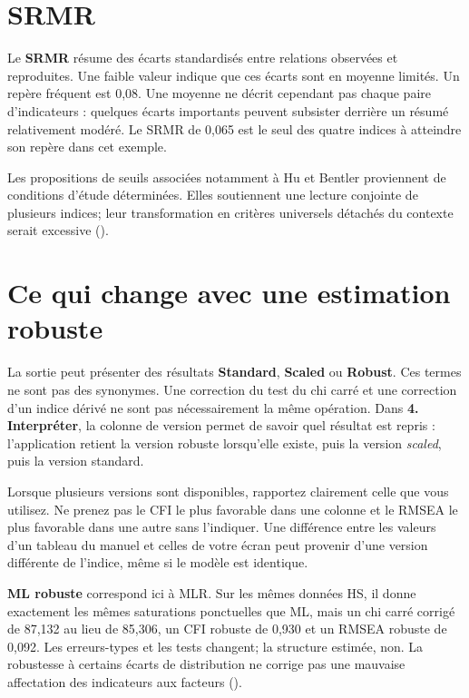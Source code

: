 \documentclass[
  french,
  11pt,
  a4paper,
  DIV=11,
  numbers=noendperiod]{scrreprt}
\begin{document}
\section{SRMR}\label{srmr}

Le \textbf{SRMR} résume des écarts standardisés entre relations
observées et reproduites. Une faible valeur indique que ces écarts sont
en moyenne limités. Un repère fréquent est 0,08. Une moyenne ne décrit
cependant pas chaque paire d'indicateurs : quelques écarts importants
peuvent subsister derrière un résumé relativement modéré. Le SRMR de
0,065 est le seul des quatre indices à atteindre son repère dans cet
exemple.

Les propositions de seuils associées notamment à Hu et Bentler
proviennent de conditions d'étude déterminées. Elles soutiennent une
lecture conjointe de plusieurs indices; leur transformation en critères
universels détachés du contexte serait excessive
().

\section{Ce qui change avec une estimation
robuste}\label{ce-qui-change-avec-une-estimation-robuste}

La sortie peut présenter des résultats \textbf{Standard},
\textbf{Scaled} ou \textbf{Robust}. Ces termes ne sont pas des
synonymes. Une correction du test du chi carré et une correction d'un
indice dérivé ne sont pas nécessairement la même opération. Dans
\textbf{4. Interpréter}, la colonne de version permet de savoir quel
résultat est repris : l'application retient la version robuste
lorsqu'elle existe, puis la version \emph{scaled}, puis la version
standard.

Lorsque plusieurs versions sont disponibles, rapportez clairement celle
que vous utilisez. Ne prenez pas le CFI le plus favorable dans une
colonne et le RMSEA le plus favorable dans une autre sans l'indiquer.
Une différence entre les valeurs d'un tableau du manuel et celles de
votre écran peut provenir d'une version différente de l'indice, même si
le modèle est identique.

\textbf{ML robuste} correspond ici à MLR. Sur les mêmes données HS, il
donne exactement les mêmes saturations ponctuelles que ML, mais un chi
carré corrigé de 87,132 au lieu de 85,306, un CFI robuste de 0,930 et un
RMSEA robuste de 0,092. Les erreurs-types et les tests changent; la
structure estimée, non. La robustesse à certains écarts de distribution
ne corrige pas une mauvaise affectation des indicateurs aux facteurs
().
\end{document}
